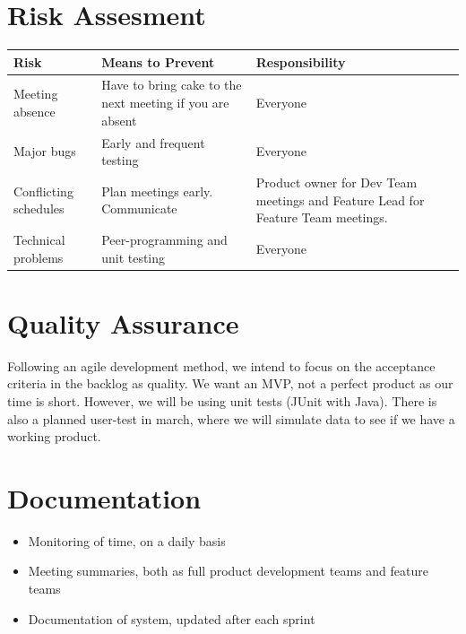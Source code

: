 \documentclass[a4paper,12pt]{article}
\begin{document}
\section{Risk Assesment}
\begin{tabularx}{\textwidth}{YYY}
	\hline
	Risk & Means to Prevent & Responsibility \\
	\hline
	Meeting absence & Have to bring cake to the next meeting if you are absent & Everyone\\
	Major bugs & Early and frequent testing & Everyone \\
	Conflicting schedules & Plan meetings early. Communicate & Product owner for Dev Team meetings and Feature Lead for Feature Team meetings. \\
	Technical problems & Peer-programming and unit testing & Everyone \\ \hline
\end{tabularx}

\section{Quality Assurance}
Following an agile development method, we intend to focus on the acceptance criteria in the backlog as quality. We want an MVP, not a perfect product as our time is short. However, we will be using unit tests (JUnit with Java). 
There is also a planned user-test in march, where we will simulate data to see if we have a working product.

\section{Documentation}
\begin{itemize}
	\item Monitoring of time, on a daily basis
	\item Meeting summaries, both as full product development teams and feature teams
	\item Documentation of system, updated after each sprint
\end{itemize}
\end{document}
